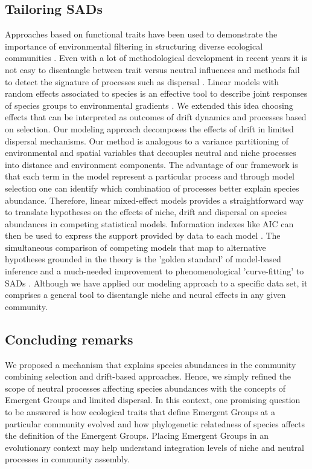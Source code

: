 \documentclass[12pt]{article}
\begin{document}

\subsection*{Tailoring SADs}

Approaches based on functional traits have been used to demonstrate the importance of environmental  filtering  in  structuring  diverse  ecological communities \citep{lavorel2002predicting, Baraloto2012}. Even with a lot of methodological development in recent years it is not easy to disentangle between trait versus neutral influences and methods fail to detect the signature of processes such as dispersal \citep{kembel2009disentangling}. Linear models with random effects associated to species is an effective tool to describe joint responses of species groups to environmental gradients \citep{Jackson2012, Brown2014}. We extended this idea choosing effects that can be interpreted as outcomes of drift dynamics and processes based on selection. Our modeling approach  decomposes the effects of drift in limited dispersal mechanisms. Our method is analogous to a variance partitioning of environmental and spatial variables \citep{Gilbert2004a} that decouples neutral and niche processes into distance and environment components. The advantage of our framework is that each term in the model represent a particular process and through model selection one can identify which combination of processes better explain species abundance. Therefore, linear mixed-effect models provides a straightforward way to translate hypotheses on the effects of niche, drift and dispersal on species abundances in competing statistical models. Information indexes like AIC can then be used to express the support provided by data to each model \citep{Burham2002, Johnson2004}. The simultaneous comparison of competing models that map to alternative hypotheses grounded in the theory is the 'golden standard' of model-based inference \citep{Hilborn1997} 
and a much-needed improvement to phenomenological 'curve-fitting' to SADs \citep{Mcgill2003}. Although we have applied our modeling approach to a specific data set, it comprises a general tool to disentangle niche and neural effects in any given community. 


\subsection*{Concluding remarks}

We proposed a mechanism that explains species abundances in the community combining selection and drift-based approaches. Hence, we simply refined the scope of neutral processes affecting species abundances with the concepts of Emergent Groups and limited dispersal. In this context, one promising question to be answered is how ecological traits that define Emergent Groups at a particular community
evolved and how phylogenetic relatedness of species affects the definition of the Emergent Groups. Placing Emergent Groups in an evolutionary context may help understand integration levels of niche
and neutral processes in community assembly.
\end{document}
